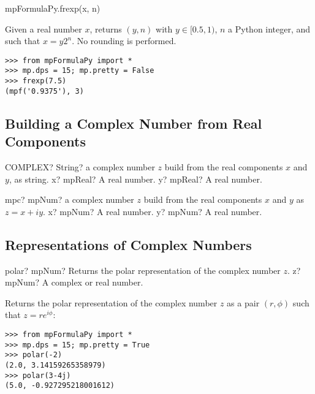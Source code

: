 mpFormulaPy.frexp(x, n)

\vpara
Given a real number $x$, returns $(y,n)$ with $y \in [0.5,1)$, $n$ a Python integer, and such that $x=y2^n$. No rounding is performed.

\begin{lstlisting}
>>> from mpFormulaPy import *
>>> mp.dps = 15; mp.pretty = False
>>> frexp(7.5)
(mpf('0.9375'), 3)
\end{lstlisting}




\subsection{Building a Complex Number from Real Components}


\begin{mpFunctionsExtract}
	\mpWorksheetFunctionTwoNotImplemented
	{COMPLEX? String? a complex number $z$ build from the real components $x$ and $y$, as string.}
	{x? mpReal? A real number.}
	{y? mpReal? A real number.}
\end{mpFunctionsExtract}

\vspace{0.6cm}

\begin{mpFunctionsExtract}
	\mpFunctionTwo
	{mpc? mpNum? a complex number $z$ build from the real components $x$ and $y$ as $z=x+iy$.}
	{x? mpNum? A real number.}
	{y? mpNum? A real number.}
\end{mpFunctionsExtract}


\subsection{Representations of Complex Numbers}

\begin{mpFunctionsExtract}
	\mpFunctionOne
	{polar? mpNum? Returns the polar representation of the complex number $z$.}
	{z? mpNum? A complex or real number.}
\end{mpFunctionsExtract}


\vpara
Returns the polar representation of the complex number $z$ as a pair $(r,\phi)$ such that $z=r e^{i\phi}$:

\begin{lstlisting}
>>> from mpFormulaPy import *
>>> mp.dps = 15; mp.pretty = True
>>> polar(-2)
(2.0, 3.14159265358979)
>>> polar(3-4j)
(5.0, -0.927295218001612)
\end{lstlisting}



